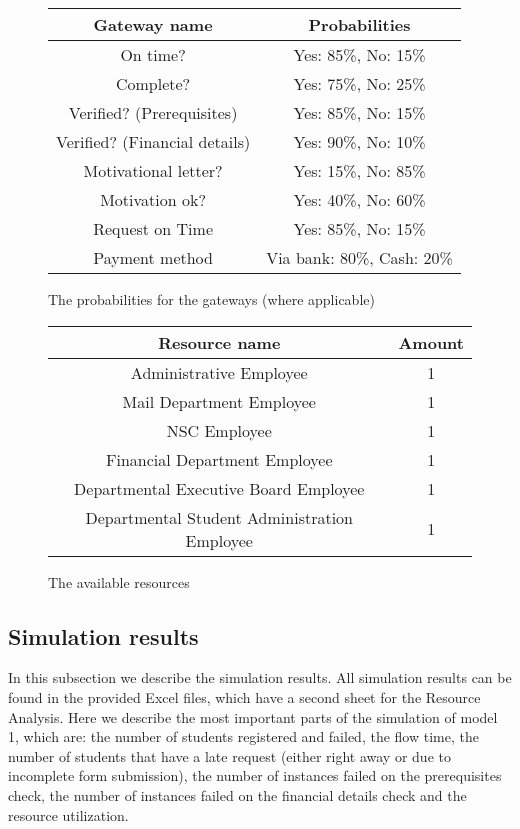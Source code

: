 \begin{figure}[h!]
	\centering
	\begin{tabular}{ | c | c | }
		\hline
		\textbf{Gateway name} & \textbf{Probabilities} \\ \hline\hline
		On time? & Yes: 85\%, No: 15\% \\ \hline
		Complete? & Yes: 75\%, No: 25\% \\ \hline
		Verified? (Prerequisites) & Yes: 85\%, No: 15\% \\ \hline
		Verified? (Financial details) & Yes: 90\%, No: 10\% \\ \hline
		Motivational letter? & Yes: 15\%, No: 85\% \\ \hline
		Motivation ok? & Yes: 40\%, No: 60\% \\ \hline
		Request on Time & Yes: 85\%, No: 15\% \\ \hline	
		Payment method & Via bank: 80\%, Cash: 20\% \\ \hline			
		\hline
	\end{tabular}
	\caption{The probabilities for the gateways (where applicable)}
	\label{fig:probabilities1}
\end{figure}

\begin{figure}[h!]
	\centering
	\begin{tabular}{ | c | c | }
		\hline
		\textbf{Resource name} & \textbf{Amount} \\ \hline\hline
		Administrative Employee & 1 \\ \hline		
		Mail Department Employee & 1 \\ \hline
		NSC Employee & 1 \\ \hline
		Financial Department Employee & 1 \\ \hline
		Departmental Executive Board Employee & 1 \\ \hline
		Departmental Student Administration Employee & 1 \\ \hline
		\hline
	\end{tabular}
	\caption{The available resources}
	\label{fig:resources1}
\end{figure}


\subsection{Simulation results}
In this subsection we describe the simulation results. All simulation results can be found in the provided Excel files, which have a second sheet for the Resource Analysis. Here we describe the most important parts of the simulation of model 1, which are: the number of students registered and failed, the flow time, the number of students that have a late request (either right away or due to incomplete form submission), the number of instances failed on the prerequisites check, the number of instances failed on the financial details check and the resource utilization.\\

